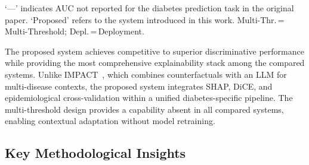 \documentclass[conference]{IEEEtran}
\begin{document}
\begin{table}[htbp]
\caption{Comparison with Related Systems}
\label{tab:comparison}
\centering
{}
\vspace{2pt}

\raggedright\scriptsize `---' indicates AUC not reported for the diabetes prediction task in the original paper. `Proposed' refers to the system introduced in this work. Multi-Thr.\,=\,Multi-Threshold; Depl.\,=\,Deployment.
\end{table}

The proposed system achieves competitive to superior discriminative performance while providing the most comprehensive explainability stack among the compared systems. Unlike IMPACT~\cite{b11}, which combines counterfactuals with an LLM for multi-disease contexts, the proposed system integrates SHAP, DiCE, and epidemiological cross-validation within a unified diabetes-specific pipeline. The multi-threshold design provides a capability absent in all compared systems, enabling contextual adaptation without model retraining.

\subsection{Key Methodological Insights}
\end{document}

